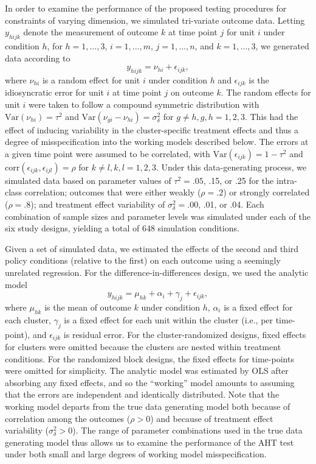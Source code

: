 \documentclass[12pt]{article}\usepackage[]{graphicx}\usepackage[]{color}
\newcommand{\Var}{\text{Var}}
\begin{document}
In order to examine the performance of the proposed testing procedures for constraints of varying dimension, we simulated tri-variate outcome data. 
Letting $y_{hijk}$ denote the measurement of outcome $k$ at time point $j$ for unit $i$ under condition $h$, for $h = 1,...,3$, $i = 1,...,m$, $j = 1,...,n$, and $k = 1,...,3$, we generated data according to 
\begin{equation}
\label{eq:data_generating_model}
y_{hijk} = \nu_{hi} + \epsilon_{ijk},
\end{equation}
where $\nu_{hi}$ is a random effect for unit $i$ under condition $h$ and $\epsilon_{ijk}$ is the idiosyncratic error for unit $i$ at time point $j$ on outcome $k$. 
The random effects for unit $i$ were taken to follow a compound symmetric distribution with $\Var\left(\nu_{hi}\right) = \tau^2$ and $\text{Var}\left(\nu_{gi} - \nu_{hi}\right) = \sigma_\delta^2$ for $g \neq h, g,h = 1,2,3$. 
This had the effect of inducing variability in the cluster-specific treatment effects and thus a degree of misspecification into the working models described below. 
The errors at a given time point were assumed to be correlated, with $\Var\left(\epsilon_{ijk}\right) = 1 - \tau^2$ and $\text{corr}\left(\epsilon_{ijk}, \epsilon_{ijl}\right) = \rho$ for $k\neq l, k,l = 1,2,3$. 
Under this data-generating process, we simulated data based on parameter values of $\tau^2 = .05$, .15, or .25 for the intra-class correlation; outcomes that were either weakly ($\rho = .2$) or strongly correlated ($\rho = .8$); and treatment effect variability of $\sigma_\delta^2 = .00$, .01, or .04.
Each combination of sample sizes and parameter levels was simulated under each of the six study designs, yielding a total of 648 simulation conditions.

Given a set of simulated data, we estimated the effects of the second and third policy conditions (relative to the first) on each outcome using a seemingly unrelated regression. 
For the difference-in-differences design, we used the analytic model
\begin{equation}
\label{eq:sim_analytic_model}
y_{hijk} = \mu_{hk} + \alpha_i + \gamma_j + \epsilon_{ijk},
\end{equation}
where $\mu_{hk}$ is the mean of outcome $k$ under condition $h$, $\alpha_i$ is a fixed effect for each cluster, $\gamma_j$ is a fixed effect for each unit within the cluster (i.e., per time-point), and $\epsilon_{ijk}$ is residual error. 
For the cluster-randomized designs, fixed effects for clusters were omitted because the clusters are nested within treatment conditions. For the randomized block designs, the fixed effects for time-points were omitted for simplicity.
The analytic model was estimated by OLS after absorbing any fixed effects, and so the ``working'' model amounts to assuming that the errors are independent and identically distributed. 
Note that the working model departs from the true data generating model both because of correlation among the outcomes ($\rho > 0$) and because of treatment effect variability ($\sigma_\delta^2 > 0$). 
The range of parameter combinations used in the true data generating model thus allows us to examine the performance of the AHT test under both small and large degrees of working model misspecification. 
\end{document}
